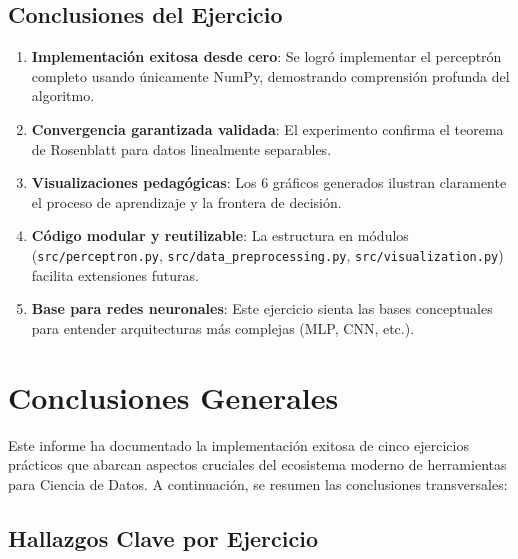 \documentclass[12pt]{src/formato_utem}
\begin{document}
\subsection{Conclusiones del Ejercicio}

\begin{enumerate}
    \item \textbf{Implementación exitosa desde cero}: Se logró implementar el perceptrón completo usando únicamente NumPy, demostrando comprensión profunda del algoritmo.
    
    \item \textbf{Convergencia garantizada validada}: El experimento confirma el teorema de Rosenblatt para datos linealmente separables.
    
    \item \textbf{Visualizaciones pedagógicas}: Los 6 gráficos generados ilustran claramente el proceso de aprendizaje y la frontera de decisión.
    
    \item \textbf{Código modular y reutilizable}: La estructura en módulos (\texttt{src/perceptron.py}, \texttt{src/data\_preprocessing.py}, \texttt{src/visualization.py}) facilita extensiones futuras.
    
    \item \textbf{Base para redes neuronales}: Este ejercicio sienta las bases conceptuales para entender arquitecturas más complejas (MLP, CNN, etc.).
\end{enumerate}

\newpage

\section{Conclusiones Generales}

Este informe ha documentado la implementación exitosa de cinco ejercicios prácticos que abarcan aspectos cruciales del ecosistema moderno de herramientas para Ciencia de Datos. A continuación, se resumen las conclusiones transversales:

\subsection{Hallazgos Clave por Ejercicio}
\end{document}
